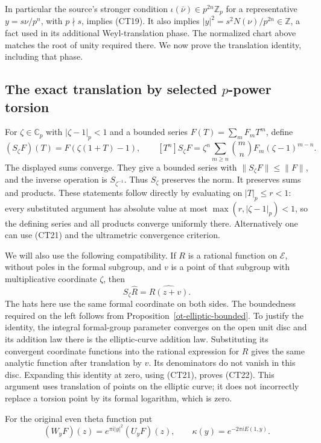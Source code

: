 In particular the source's stronger condition
$\iota(\bar\nu)\in p^{2n}\mathbb Z_p$ for a representative
$y=s\nu/p^n$, with $p\nmid s$, implies (CT19).  It also implies
$|y|^2=s^2N(\nu)/p^{2n}\in\mathbb Z$, a fact used in its
additional Weyl-translation phase.  The normalized chart above
matches the root of unity required there.  We now prove the
translation identity, including that phase.

\subsection{The exact translation by selected $p$-power torsion}

For $\zeta\in\mathbb C_p$ with $|\zeta-1|_p<1$ and a bounded
series $F(T)=\sum_m F_mT^m$, define
\[
 (S_\zeta F)(T)=F(\zeta(1+T)-1),\qquad
 [T^n]S_\zeta F
       =\zeta^n\sum_{m\ge n}\binom mn F_m(\zeta-1)^{m-n}.
 \tag{CT21}
\]
The displayed sums converge.  They give a bounded series with
$\|S_\zeta F\|\le\|F\|$, and the inverse operation is
$S_{\zeta^{-1}}$.  Thus $S_\zeta$ preserves the norm.
It preserves sums and products.  These statements follow directly
by evaluating on $|T|_p\le r<1$: every substituted argument has
absolute value at most $\max(r,|\zeta-1|_p)<1$, so the defining
series and all products converge uniformly there.  Alternatively
one can use (CT21) and the ultrametric convergence criterion.

We will also use the following compatibility.  If $R$ is a
rational function on $\mathscr E$, without poles in the formal
subgroup, and $v$ is a point of that subgroup with multiplicative
coordinate $\zeta$, then
\[
                 S_\zeta\widehat R=\widehat{R(z+v)}.
 \tag{CT22}
\]
The hats here use the same formal coordinate on both sides.
The boundedness required on the left follows from
Proposition~\ref{ot-elliptic-bounded}.  To justify the identity,
the integral formal-group parameter converges on the open unit
disc and its addition law there is the elliptic-curve addition
law.  Substituting its convergent coordinate functions into the
rational expression for $R$ gives the same analytic function
after translation by $v$.  Its denominators do not vanish in
this disc.  Expanding this identity at zero, using (CT21), proves
(CT22).  This argument uses translation of points on the elliptic
curve; it does not incorrectly replace a torsion point by its
formal logarithm, which is zero.

For the original even theta function put
\[
           (W_yF)(z)=e^{\pi i|y|^2}(U_yF)(z),\qquad
              \kappa(y)=e^{-2\pi iE(1,y)}.
 \tag{CT23}
\]

